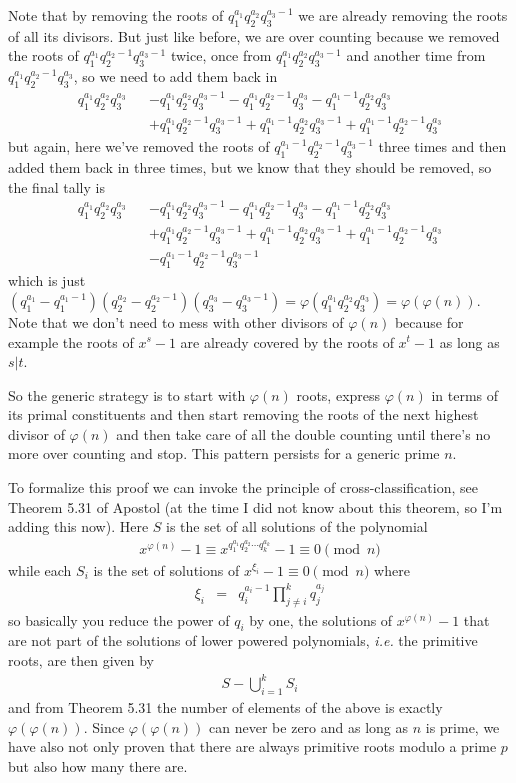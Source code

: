 \documentclass[aps,preprint,preprintnumbers,nofootinbib,showpacs,prd]{revtex4-1}
\newcommand{\ie}{{\it i.e.} }
\newcommand{\nbea}{\begin{eqnarray*}}
\newcommand{\neea}{\end{eqnarray*}}
\begin{document}
Note that by removing the roots of $q_1^{a_1}q_2^{a_2}q_3^{a_3-1}$ we are already removing the roots of all its divisors. But just like before, we are over counting because we removed the roots of $q_1^{a_1}q_2^{a_2-1}q_3^{a_3-1}$ twice, once from $q_1^{a_1}q_2^{a_2}q_3^{a_3-1}$ and another time from $q_1^{a_1}q_2^{a_2-1}q_3^{a_3}$, so we need to add them back in
%
\nbea
q_1^{a_1}q_2^{a_2}q_3^{a_3} &&  - q_1^{a_1}q_2^{a_2}q_3^{a_3-1} - q_1^{a_1}q_2^{a_2-1}q_3^{a_3}- q_1^{a_1-1}q_2^{a_2}q_3^{a_3} \\
&& + q_1^{a_1}q_2^{a_2-1}q_3^{a_3-1} + q_1^{a_1-1}q_2^{a_2}q_3^{a_3-1} + q_1^{a_1-1}q_2^{a_2-1}q_3^{a_3}
\neea
%
but again, here we've removed the roots of $q_1^{a_1-1}q_2^{a_2-1}q_3^{a_3-1}$ three times and then added them back in three times, but we know that they should be removed, so the final tally is
%
\nbea
q_1^{a_1}q_2^{a_2}q_3^{a_3} &&  - q_1^{a_1}q_2^{a_2}q_3^{a_3-1} - q_1^{a_1}q_2^{a_2-1}q_3^{a_3}- q_1^{a_1-1}q_2^{a_2}q_3^{a_3} \\
&& + q_1^{a_1}q_2^{a_2-1}q_3^{a_3-1} + q_1^{a_1-1}q_2^{a_2}q_3^{a_3-1} + q_1^{a_1-1}q_2^{a_2-1}q_3^{a_3} \\
&& -q_1^{a_1-1}q_2^{a_2-1}q_3^{a_3-1}
\neea
%
which is just $(q_1^{a_1} - q_1^{a_1-1})(q_2^{a_2}-q_2^{a_2-1})(q_3^{a_3} - q_3^{a_3-1}) =\varphi(q_1^{a_1}q_2^{a_2}q_3^{a_3}) = \varphi(\varphi(n))$. Note that we don't need to mess with other divisors of $\varphi(n)$ because for example the roots of $x^s - 1$ are already covered by the roots of $x^t - 1$ as long as $s|t$.

So the generic strategy is to start with $\varphi(n)$ roots, express $\varphi(n)$ in terms of its primal constituents and then start removing the roots of the next highest divisor of $\varphi(n)$ and then take care of all the double counting until there's no more over counting and stop. This pattern persists for a generic prime $n$.

To formalize this proof we can invoke the principle of cross-classification, see Theorem 5.31 of Apostol (at the time I did not know about this theorem, so I'm adding this now). Here $S$ is the set of all solutions of the polynomial
%
\nbea
x^{\varphi(n)} - 1 \equiv x^{q_1^{a_1}q_2^{a_2} \cdots q_k^{a_k}} - 1 \equiv 0 \pmod{n}
\neea
%
while each $S_i$ is the set of solutions of $x^{\xi_i} - 1 \equiv 0 \pmod{n}$ where 
%
\nbea
\xi_i & = & q_i^{a_i - 1} \prod_{j\neq i}^k q_j^{a_j}
\neea
%
so basically you reduce the power of $q_i$ by one, the solutions of $x^{\varphi(n)} - 1$ that are not part of the solutions of lower powered polynomials, \ie the primitive roots, are then given by
%
\nbea
S - \bigcup_{i=1}^k S_i
\neea
%
and from Theorem 5.31 the number of elements of the above is exactly $\varphi(\varphi(n))$.
Since $\varphi(\varphi(n))$ can never be zero and as long as $n$ is prime, we have also not only proven that there are always primitive roots modulo a prime $p$ but also how many there are.
\end{document}
